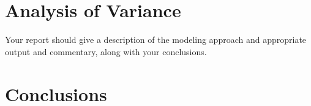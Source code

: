 \documentclass{article}
\begin{document}
\section{Analysis of Variance}

Your report should give a description of the modeling approach and appropriate output and commentary, along with your conclusions. 



\section{Conclusions}
\end{document}

